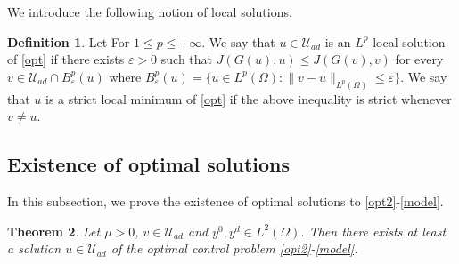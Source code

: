 \documentclass[reqno,twoside]{amsart}
\numberwithin{equation}{section}
\newtheorem{theorem}{Theorem}[section]
\theoremstyle{definition}
\newtheorem{definition}[theorem]{Definition}
\numberwithin{equation}{section}
\def \U {{\mathcal U}}
\def \U {\mathcal{U}}
\begin{document}
We introduce the following notion of local  solutions.
\begin{definition}\label{defopt}
Let For $1 \leq p \leq +\infty$. We say that $u\in \U_{ad}$ is an $L^p$-local solution of \eqref{opt} if there exists $\varepsilon>0$ such that $J(G(u),u)\leq J(G(v),v)$ for every $v\in \U_{ad}\cap B^p_\varepsilon(u)$ where $ B^p_\varepsilon(u)=\{u\in L^p(\Omega):\|v-u\|_{L^p(\Omega)}\leq \varepsilon\}$. We say that $u$ is a strict local minimum of \eqref{opt} if the above inequality is strict whenever $v\neq u$.
\end{definition}

\subsection{Existence of optimal solutions}
In this subsection, we prove the existence of optimal solutions to \eqref{opt2}-\eqref{model}.	
\begin{theorem}\label{existcontrol1}
Let  $\mu>0$, $v\in \mathcal{U}_{ad}$ and $y^{0},y^d\in L^2(\Omega)$. Then  there exists at least a solution  $u\in \mathcal{U}_{ad}$ of the optimal control problem \eqref{opt2}-\eqref{model}.
\end{theorem}
\end{document}
